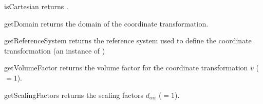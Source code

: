 \begin{methoddesc}[CartesianCoordinateTransformation]{isCartesian}{}
returns \True.
\end{methoddesc}

\begin{methoddesc}[CartesianCoordinateTransformation]{getDomain}{}
returns the domain of the coordinate transformation.
\end{methoddesc}


\begin{methoddesc}[CartesianCoordinateTransformation]{getReferenceSystem}{}
returns the reference system used to define the coordinate transformation (an instance of )
\end{methoddesc}


\begin{methoddesc}[CartesianCoordinateTransformation]{getVolumeFactor}{}
returns the volume factor for the coordinate transformation $v$ ($=1$).
\end{methoddesc}


\begin{methoddesc}[CartesianCoordinateTransformation]{getScalingFactors}{}
returns the scaling factors $d_{\alpha \alpha}$ ($=1$).
\end{methoddesc}